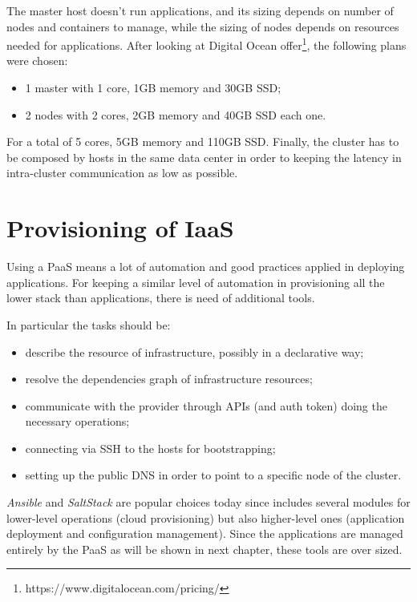 The master host doesn't run applications, and its sizing depends on number of nodes and containers to manage, while the sizing of nodes depends on  resources needed for applications.  After looking at Digital Ocean offer\footnote{https://www.digitalocean.com/pricing/}, the following plans were chosen:

\begin{itemize}
\item 1 master with 1 core, 1GB memory and 30GB SSD;
\item 2 nodes with 2 cores, 2GB memory and 40GB SSD each one.
\end{itemize}

For a total of 5 cores, 5GB memory and 110GB SSD.  Finally, the cluster has to be composed by hosts in the same data center in order to keeping the latency in intra-cluster communication as low as possible.

\section{Provisioning of IaaS}\label{provisioning-of-iaas}

Using a PaaS means a lot of automation and good practices applied in deploying applications.  For keeping a similar level of automation in provisioning all the lower stack than applications, there is need of additional tools.

In particular the tasks should be:
\begin{itemize}
\item describe the resource of infrastructure, possibly in a declarative way;
\item resolve the dependencies graph of infrastructure resources;
\item communicate with the provider through APIs (and auth token) doing the necessary operations;
\item connecting via SSH to the hosts for bootstrapping;
\item setting up the public DNS in order to point to a specific node of the cluster.
\end{itemize}

\textit{Ansible} and \textit{SaltStack} are popular choices today since includes several modules for lower-level operations (cloud provisioning) but also higher-level ones (application deployment and configuration management).  Since the applications are managed entirely by the PaaS as will be shown in next chapter, these tools are over sized.

